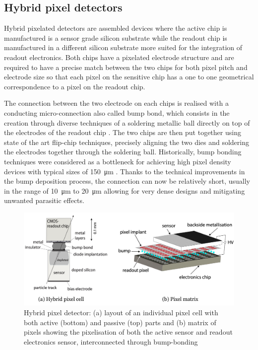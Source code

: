 		\subsection{Hybrid pixel detectors }\label{subsec:2.4.1}
	
		Hybrid pixelated detectors are assembled devices where the active chip is manufactured is a sensor grade silicon substrate while the readout chip is manufactured in a different silicon substrate more suited for the integration of readout electronics. Both chips have a pixelated electrode structure and are required to have a precise match between the two chips for both pixel pitch and electrode size so that each pixel on the sensitive chip has a one to one geometrical correspondence to a pixel on the readout chip.
		
		The connection between the two electrode on each chips is realised with a conducting micro-connection also called bump bond, which consists in the creation through diverse techniques of a soldering metallic ball directly on top of the electrodes of the readout chip \cite{flipChip}. The two chips are then put together using state of the art flip-chip techniques, precisely aligning the two dies and soldering the electrodes together through the soldering ball. Historically, bump bonding techniques were considered as a bottleneck for achieving high pixel density devices with typical sizes of \SI{150}{\micro\meter} \cite{flipChip}. Thanks to the technical improvements in the bump deposition process, the connection can now be relatively short, usually in the range of \SI{10}{\micro\meter} to \SI{20}{\micro\meter} allowing for very dense designs and mitigating unwanted parasitic effects. 
		
		\begin{figure}[h]
			\centering
			\includegraphics[width=0.9\linewidth]{files/hybrid_detector}
			\caption{Hybrid pixel detector: (a) layout of an individual pixel cell with both active (bottom) and passive (top) parts and (b) matrix of pixels showing the pixelisation of both the active sensor and readout electronics sensor, interconnected through bump-bonding \cite{detectors}}
			\label{ }
		\end{figure}
		
